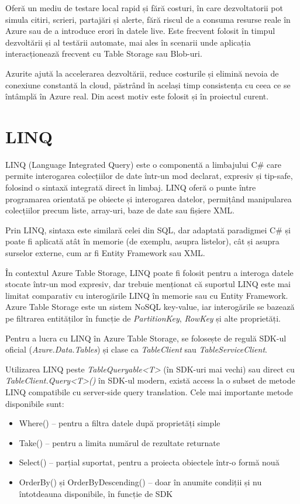Oferă un mediu de testare local rapid și fără costuri, în care dezvoltatorii pot simula citiri, scrieri, partajări și alerte, fără riscul de a consuma resurse reale în Azure sau de a introduce erori în datele live. Este frecvent folosit în timpul dezvoltării și al testării automate, mai ales în scenarii unde aplicația interacționează frecvent cu Table Storage sau Blob-uri. \parencite{azurite}

Azurite ajută la accelerarea dezvoltării, reduce costurile și elimină nevoia de conexiune constantă la cloud, păstrând în același timp consistența cu ceea ce se întâmplă în Azure real. Din acest motiv este folosit și în proiectul curent.

\section{LINQ}

LINQ (Language Integrated Query) este o componentă a limbajului C\# care permite interogarea colecțiilor de date într-un mod declarat, expresiv și tip-safe, folosind o sintaxă integrată direct în limbaj. LINQ oferă o punte între programarea orientată pe obiecte și interogarea datelor, permițând manipularea colecțiilor precum liste, array-uri, baze de date sau fișiere XML. \parencite{linq}

Prin LINQ, sintaxa este similară celei din SQL, dar adaptată paradigmei C\# și poate fi aplicată atât în memorie (de exemplu, asupra listelor), cât și asupra surselor externe, cum ar fi Entity Framework sau XML. \parencite{linq}

În contextul Azure Table Storage, LINQ poate fi folosit pentru a interoga datele stocate într-un mod expresiv, dar trebuie menționat că suportul LINQ este mai limitat comparativ cu interogările LINQ în memorie sau cu Entity Framework. Azure Table Storage este un sistem NoSQL key-value, iar interogările se bazează pe filtrarea entităților în funcție de \textit{PartitionKey}, \textit{RowKey} și alte proprietăți. \parencite{linq}

Pentru a lucra cu LINQ în Azure Table Storage, se folosește de regulă SDK-ul oficial (\textit{Azure.Data.Tables}) și clase ca \textit{TableClient} sau \textit{TableServiceClient}.  \parencite{linq}

Utilizarea LINQ peste \textit{TableQueryable<T>} (în SDK-uri mai vechi) sau direct cu \textit{TableClient.Query<T>()} în SDK-ul modern, există access la o subset de metode LINQ compatibile cu server-side query translation. Cele mai importante metode disponibile sunt:
\begin{itemize}
    \item Where() – pentru a filtra datele după proprietăți simple
    \item Take() – pentru a limita numărul de rezultate returnate
    \item Select() – parțial suportat, pentru a proiecta obiectele într-o formă nouă
    \item OrderBy() și OrderByDescending() – doar în anumite condiții și nu întotdeauna disponibile, în funcție de SDK
\end{itemize}
\parencite{linq}

